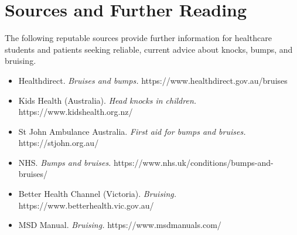 \section*{Sources and Further Reading}
The following reputable sources provide further information for healthcare students and patients seeking reliable, current advice about knocks, bumps, and bruising.
\begin{itemize}
    \item Healthdirect. \textit{Bruises and bumps.} https://www.healthdirect.gov.au/bruises
    \item Kids Health (Australia). \textit{Head knocks in children.} https://www.kidshealth.org.nz/
    \item St John Ambulance Australia. \textit{First aid for bumps and bruises.} https://stjohn.org.au/
    \item NHS. \textit{Bumps and bruises.} https://www.nhs.uk/conditions/bumps-and-bruises/
    \item Better Health Channel (Victoria). \textit{Bruising.} https://www.betterhealth.vic.gov.au/
    \item MSD Manual. \textit{Bruising.} https://www.msdmanuals.com/
\end{itemize}
